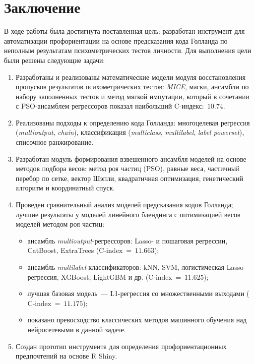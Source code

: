 
\section*{Заключение}

В ходе работы была достигнута поставленная цель: разработан инструмент для автоматизации профориентации на основе предсказания кода Голланда по неполным результатам психометрических тестов личности. Для выполнения цели были решены следующие задачи:
\begin{enumerate}
    \item Разработаны и реализованы математические модели модуля восстановления пропусков результатов психометрических тестов: \emph{MICE}, маски, ансамбли по набору заполненных тестов и метод мягкой импутации, который в сочетании с PSO-ансамблем регрессоров показал наибольший C-индекс:~$10.74$.

    \item Реализованы подходы к определению кода Голланда: многоцелевая регрессия (\emph{multioutput}, \emph{chain}), классификация (\emph{multiclass}, \emph{multilabel}, \emph{label powerset}), списочное ранжирование.

    \item Разработан модуль формирования взвешенного ансамбля моделей на основе методов подбора весов: метод роя частиц (PSO), равные веса, частичный перебор по сетке, вектор Шэпли, квадратичная оптимизация, генетический алгоритм и координатный спуск.
    
    \item Проведен сравнительный анализ моделей предсказания кодов Голланда; лучшие результаты у моделей линейного блендинга с оптимизацией весов моделей методом роя частиц:
      \begin{itemize}[noitemsep, topsep=0pt, parsep=0pt, partopsep=0pt]
        \item ансамбль \emph{multioutput}‑регрессоров: Lasso- и пошаговая регрессии, CatBoost, ExtraTrees ($\text{C‑index}~=~11.663$);
        \item ансамбль \emph{multilabel}‑классификаторов: kNN, SVM, логистическая Lasso-регрессия, XGBoost, LightGBM и др. ($\text{C‑index}~=~11.625$);
        \item лучшая базовая модель~--- L1-регрессия со множественными выходами ($\text{C‑index}~=~11.175$);
        \item показано превосходство классических методов машинного обучения над нейросетевыми в данной задаче.
      \end{itemize}

    \item Создан прототип инструмента для определения профориентационных предпочтений на основе R Shiny.
\end{enumerate}

